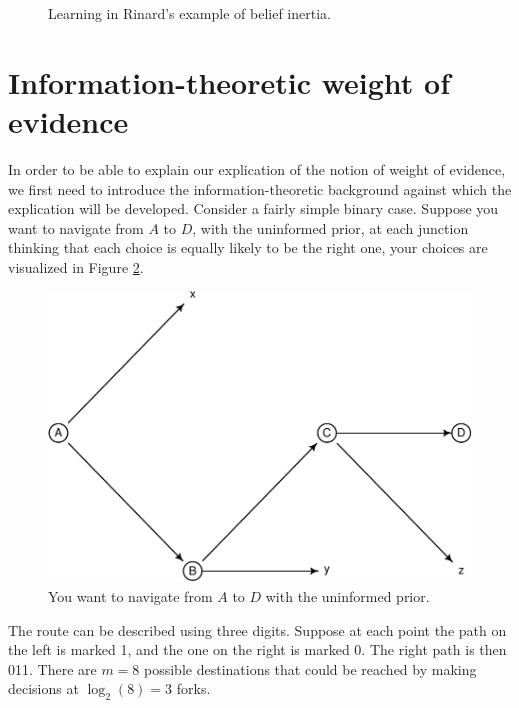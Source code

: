 \documentclass[
  10pt,
  dvipsnames,enabledeprecatedfontcommands]{scrartcl}
\begin{document}
\begin{figure}[H]

\caption{Learning in Rinard's example of belief inertia.}
\label{fig:rinard2}
\end{figure}


\hypertarget{information-theoretic-weight-of-evidence}{%
\section{Information-theoretic weight of
evidence}\label{information-theoretic-weight-of-evidence}}

In order to be able to explain our explication of the notion of weight
of evidence, we first need to introduce the information-theoretic
background against which the explication will be developed. Consider a
fairly simple binary case. Suppose you want to navigate from \(A\) to
\(D\), with the uninformed prior, at each junction thinking that each
choice is equally likely to be the right one, your choices are
visualized in Figure \ref{fig:entDAG}.

\begin{figure}[H]

\begin{center}\includegraphics[width=0.7\linewidth]{imprecision_weight_files/figure-latex/label-1} \end{center}
\caption{You want to navigate from $A$ to $D$ with the uninformed prior.}
\label{fig:entDAG}
\end{figure}

The route can be described using three digits. Suppose at each point the
path on the left is marked 1, and the one on the right is marked 0. The
right path is then 011. There are \(m=8\) possible destinations that
could be reached by making decisions at \(\log_2(8)=3\) forks.
\end{document}
